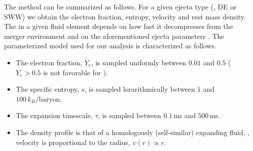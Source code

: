 The method can be summarized as follows. 
For a given ejecta type (\eg, \ac{DE} or \ac{SWW}) we obtain the electron fraction,
entropy, velocity and rest mass density. %
%
The \rproc{} in a given fluid element depends on how fast it decompresses from the 
merger environment and on the aforementioned ejecta parameters \citep{Lippuner:2015gwa}. 
The parameterized model used for our analysis is characterized as follows. 
%
\begin{itemize}
    \setlength\itemsep{0.1em}
    \item The electron fraction, $Y_e$, is sampled uniformly between $0.01$ and $0.5$ 
    ($Y_e>0.5$ is not favorable for \rproc{}).
    \item The specific entropy, $s$, is sampled lorarithmically 
    between $1$ and $100\, k_B/\text{baryon}$.
    \item The expansion timescale, %
    $\tau$, is sampled between $0.1\,$ms and $500\,$ms.
    \item The density profile is that of a homologously (self-similar) expanding 
    fluid, \ie, velocity is proportional to the radius, $\upsilon(r)\propto r$.
%    
%    
\end{itemize}



